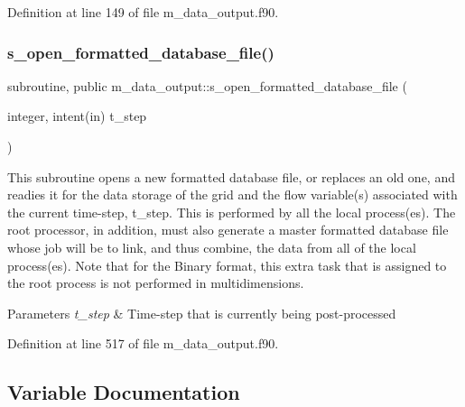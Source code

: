 Definition at line 149 of file m\+\_\+data\+\_\+output.\+f90.

\mbox{\label{namespacem__data__output_ae767b4364e76ee05872868171fd2f05d}} 
\subsubsection{\texorpdfstring{s\+\_\+open\+\_\+formatted\+\_\+database\+\_\+file()}{s\_open\_formatted\_database\_file()}}
{\footnotesize\ttfamily subroutine, public m\+\_\+data\+\_\+output\+::s\+\_\+open\+\_\+formatted\+\_\+database\+\_\+file (\begin{DoxyParamCaption}\item[{integer, intent(in)}]{t\+\_\+step }\end{DoxyParamCaption})}



This subroutine opens a new formatted database file, or replaces an old one, and readies it for the data storage of the grid and the flow variable(s) associated with the current time-\/step, t\+\_\+step. This is performed by all the local process(es). The root processor, in addition, must also generate a master formatted database file whose job will be to link, and thus combine, the data from all of the local process(es). Note that for the Binary format, this extra task that is assigned to the root process is not performed in multidimensions. 


\begin{DoxyParams}{Parameters}
{\em t\+\_\+step} & Time-\/step that is currently being post-\/processed \\
\hline
\end{DoxyParams}


Definition at line 517 of file m\+\_\+data\+\_\+output.\+f90.



\subsection{Variable Documentation}
\mbox{\label{namespacem__data__output_a8a822ed22e0ffe582b2dc7f49109fa1d}} 
